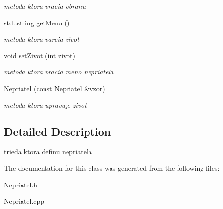 \begin{DoxyCompactItemize}
\begin{DoxyCompactList}\small\item\em metoda ktora vracia obranu \end{DoxyCompactList}\item 
\hypertarget{class_nepriatel_ab33a949533fafe3c33c7e17a17fa4831}{std\-::string \hyperlink{class_nepriatel_ab33a949533fafe3c33c7e17a17fa4831}{get\-Meno} ()}\label{class_nepriatel_ab33a949533fafe3c33c7e17a17fa4831}

\begin{DoxyCompactList}\small\item\em metoda ktora varcia zivot \end{DoxyCompactList}\item 
\hypertarget{class_nepriatel_a750713aaba696e6fba26ae688b6a9ecb}{void \hyperlink{class_nepriatel_a750713aaba696e6fba26ae688b6a9ecb}{set\-Zivot} (int zivot)}\label{class_nepriatel_a750713aaba696e6fba26ae688b6a9ecb}

\begin{DoxyCompactList}\small\item\em metoda ktora vracia meno nepriatela \end{DoxyCompactList}\item 
\hypertarget{class_nepriatel_a1228bd712885a63bbb05d6c9e39108fc}{\hyperlink{class_nepriatel_a1228bd712885a63bbb05d6c9e39108fc}{Nepriatel} (const \hyperlink{class_nepriatel}{Nepriatel} \&vzor)}\label{class_nepriatel_a1228bd712885a63bbb05d6c9e39108fc}

\begin{DoxyCompactList}\small\item\em metoda ktora upravuje zivot \end{DoxyCompactList}\end{DoxyCompactItemize}


\subsection{Detailed Description}
trieda ktora definu nepriatela 

The documentation for this class was generated from the following files\-:\begin{DoxyCompactItemize}
\item 
Nepriatel.\-h\item 
Nepriatel.\-cpp\end{DoxyCompactItemize}
